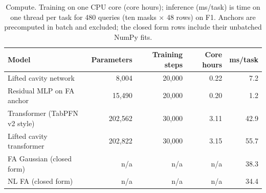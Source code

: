 \begin{table}[t]
\centering\small
\caption{\label{tab:compute}Compute. Training on one CPU core (core hours); inference (ms/task) is time on one thread per task for 480 queries (ten masks $\times$ 48 rows) on F1. Anchors are precomputed in batch and excluded; the closed form rows include their unbatched NumPy fits.}
\begin{tabular}{lrrrr}
\toprule
Model & Parameters & Training steps & Core hours & ms/task\\
\midrule
Lifted cavity network & 8{,}004 & 20{,}000 & 0.22 & 7.2\\
Residual MLP on FA anchor & 15{,}490 & 20{,}000 & 0.20 & 1.2\\
Transformer (TabPFN v2 style) & 202{,}562 & 30{,}000 & 3.11 & 42.9\\
Lifted cavity transformer & 202{,}822 & 30{,}000 & 3.15 & 55.7\\
FA Gaussian (closed form) & n/a & n/a & n/a & 38.3\\
NL FA (closed form) & n/a & n/a & n/a & 34.4\\
\bottomrule
\end{tabular}
\end{table}
